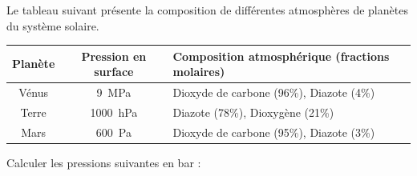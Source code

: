 
\finEntrainement







\hauteurLargeurCadreReponse		{6mm}{2.5cm}
\initialisationEntrainement

Le tableau suivant présente la composition de différentes atmosphères de planètes du système solaire.

\begin{center}
\renewcommand{\arraystretch}{1.2}
\begin{tabular}{ |c|c|l| } 
 \hline
 Planète & Pression en surface & Composition atmosphérique (fractions molaires) \\
 \hline 
 Vénus & \SI{9}{MPa}& Dioxyde de carbone (96\%), Diazote (4\%)  \\ 
 Terre & \SI{1000}{hPa} & Diazote (78\%), Dioxygène (21\%) \\ 
 Mars & \SI{600}{Pa} & Dioxyde de carbone (95\%), Diazote (3\%)  \\
 \hline
\end{tabular}
\renewcommand{\arraystretch}{1}
\end{center}

Calculer les pressions suivantes en bar :

\debutEntrainement


